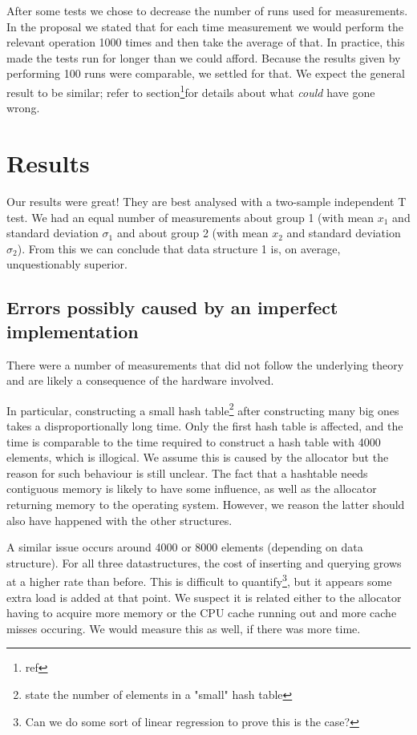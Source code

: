 \documentclass[12pt,a4paper]{article}
\begin{document}
    After some tests we chose to decrease the number of runs used for measurements.  In the proposal
    we stated that for each time measurement we would perform the relevant operation 1000 times and
    then take the average of that.  In practice, this made the tests run for longer than we could
    afford. Because the results given by performing 100 runs were comparable, we settled for that.
    We expect the general result to be similar; refer to section\footnote{ref}for details about what
    \emph{could} have gone wrong.

    \section{Results}

    Our results were great!  They are best analysed with a two-sample independent T test.  We had an
    equal number of measurements about group 1 (with mean $x_1$ and standard deviation $\sigma_1$ and
    about group 2 (with mean $x_2$ and standard deviation $\sigma_2$).  From this we can conclude that
    data structure 1 is, on average, unquestionably superior.

    \subsection{Errors possibly caused by an imperfect implementation}

    There were a number of measurements that did not follow the underlying theory and are likely a
    consequence of the hardware involved.

    In particular, constructing a small hash table\footnote{state the number of elements in a
    "small" hash table} after constructing many big ones takes a disproportionally long time.  Only
    the first hash table is affected, and the time is comparable to the time required to construct a
    hash table with 4000 elements, which is illogical.  We assume this is caused by the allocator
    but the reason for such behaviour is still unclear.  The fact that a hashtable needs contiguous
    memory is likely to have some influence, as well as the allocator returning memory to the
    operating system.  However, we reason the latter should also have happened with the other
    structures.

    A similar issue occurs around 4000 or 8000 elements (depending on data structure).  For all
    three datastructures, the cost of inserting and querying grows at a higher rate than before.
    This is difficult to quantify\footnote{Can we do some sort of linear regression to prove this is
    the case?}, but it appears some extra load is added at that point.  We suspect it is related
    either to the allocator having to acquire more memory or the CPU cache running out and more
    cache misses occuring.  We would measure this as well, if there was more time.
\end{document}
